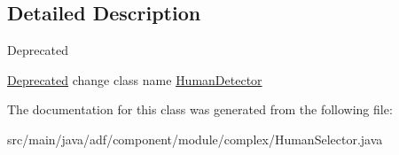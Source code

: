 \subsection{Detailed Description}
\begin{DoxyRefDesc}{Deprecated}
\item[\hyperlink{deprecated__deprecated000014}{Deprecated}]change class name \hyperlink{classadf_1_1component_1_1module_1_1complex_1_1HumanDetector}{Human\+Detector} \end{DoxyRefDesc}


The documentation for this class was generated from the following file\+:\begin{DoxyCompactItemize}
\item 
src/main/java/adf/component/module/complex/Human\+Selector.\+java\end{DoxyCompactItemize}
